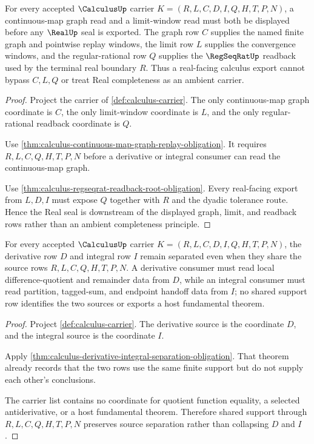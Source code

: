 \begin{theorem}
\label{thm:calculus-continuous-limit-carrier-budget}
For every accepted $\CalculusUp$ carrier $K=(R,L,C,D,I,Q,H,T,P,N)$, a continuous-map graph read and a limit-window read must both be displayed before any $\RealUp$ seal is exported. The graph row $C$ supplies the named finite graph and pointwise replay windows, the limit row $L$ supplies the convergence windows, and the regular-rational row $Q$ supplies the $\RegSeqRatUp$ readback used by the terminal real boundary $R$. Thus a real-facing calculus export cannot bypass $C,L,Q$ or treat Real completeness as an ambient carrier.
\end{theorem}
\begin{proof}
Project the carrier of \autoref{def:calculus-carrier}. The only continuous-map graph coordinate is $C$, the only limit-window coordinate is $L$, and the only regular-rational readback coordinate is $Q$.

Use \autoref{thm:calculus-continuous-map-graph-replay-obligation}. It requires $R,L,C,Q,H,T,P,N$ before a derivative or integral consumer can read the continuous-map graph.

Use \autoref{thm:calculus-regseqrat-readback-root-obligation}. Every real-facing export from $L,D,I$ must expose $Q$ together with $R$ and the dyadic tolerance route. Hence the Real seal is downstream of the displayed graph, limit, and readback rows rather than an ambient completeness principle.
\end{proof}

\begin{theorem}
\label{thm:calculus-derivative-integral-source-separation}
For every accepted $\CalculusUp$ carrier $K=(R,L,C,D,I,Q,H,T,P,N)$, the derivative row $D$ and integral row $I$ remain separated even when they share the source rows $R,L,C,Q,H,T,P,N$. A derivative consumer must read local difference-quotient and remainder data from $D$, while an integral consumer must read partition, tagged-sum, and endpoint handoff data from $I$; no shared support row identifies the two sources or exports a host fundamental theorem.
\end{theorem}
\begin{proof}
Project \autoref{def:calculus-carrier}. The derivative source is the coordinate $D$, and the integral source is the coordinate $I$.

Apply \autoref{thm:calculus-derivative-integral-separation-obligation}. That theorem already records that the two rows use the same finite support but do not supply each other's conclusions.

The carrier list contains no coordinate for quotient function equality, a selected antiderivative, or a host fundamental theorem. Therefore shared support through $R,L,C,Q,H,T,P,N$ preserves source separation rather than collapsing $D$ and $I$.
\end{proof}

